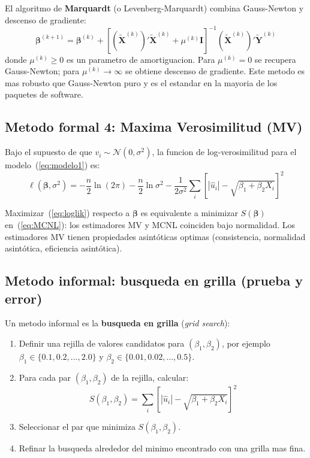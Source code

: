 \documentclass[12pt, letterpaper]{article}
\theoremstyle{remark}
\begin{document}
El algoritmo de \textbf{Marquardt} (o Levenberg-Marquardt) combina
Gauss-Newton y descenso de gradiente:
\begin{equation}
  \boldsymbol\beta^{(k+1)}
    = \boldsymbol\beta^{(k)}
    + \left[(\tilde{\mathbf{X}}^{(k)})'\tilde{\mathbf{X}}^{(k)}
            + \mu^{(k)}\mathbf{I}\right]^{-1}
      (\tilde{\mathbf{X}}^{(k)})' \tilde{\mathbf{Y}}^{(k)}
  \label{eq:Marquardt}
\end{equation}
donde $\mu^{(k)} \geq 0$ es un parametro de amortiguacion. Para $\mu^{(k)} = 0$
se recupera Gauss-Newton; para $\mu^{(k)} \to \infty$ se obtiene descenso de
gradiente. Este metodo es mas robusto que Gauss-Newton puro y es el estandar
en la mayoria de los paquetes de software.

\subsection{Metodo formal 4: Maxima Verosimilitud (MV)}

Bajo el supuesto de que $v_i \sim \mathcal{N}(0, \sigma^2)$, la funcion de
log-verosimilitud para el modelo~(\ref{eq:modelo1}) es:
\begin{equation}
  \ell(\boldsymbol\beta, \sigma^2)
    = -\frac{n}{2}\ln(2\pi) - \frac{n}{2}\ln\sigma^2
    - \frac{1}{2\sigma^2}\sum_i [|\hat u_i| - \sqrt{\beta_1 + \beta_2 X_i}]^2
  \label{eq:loglik}
\end{equation}

Maximizar~(\ref{eq:loglik}) respecto a $\boldsymbol\beta$ es equivalente a
minimizar $S(\boldsymbol\beta)$ en~(\ref{eq:MCNL}): los estimadores MV y MCNL
coinciden bajo normalidad. Los estimadores MV tienen propiedades asintóticas
optimas (consistencia, normalidad asintótica, eficiencia asintótica).

\subsection{Metodo informal: busqueda en grilla (prueba y error)}

Un metodo informal es la \textbf{busqueda en grilla} (\textit{grid search}):

\begin{enumerate}[leftmargin=1.8em, itemsep=4pt]
  \item Definir una rejilla de valores candidatos para $(\beta_1, \beta_2)$, por
    ejemplo $\beta_1 \in \{0.1, 0.2, \ldots, 2.0\}$ y $\beta_2 \in \{0.01, 0.02, \ldots, 0.5\}$.
  \item Para cada par $(\beta_1, \beta_2)$ de la rejilla, calcular:
    \begin{equation}
      S(\beta_1, \beta_2) = \sum_i [|\hat u_i| - \sqrt{\beta_1 + \beta_2 X_i}]^2
    \end{equation}
  \item Seleccionar el par que minimiza $S(\beta_1, \beta_2)$.
  \item Refinar la busqueda alrededor del minimo encontrado con una grilla
    mas fina.
\end{enumerate}
\end{document}
